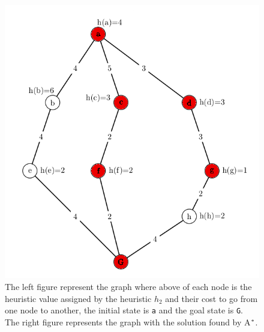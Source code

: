 \begin{figure}[!htb]
  \includegraphics[width=\linewidth]{images/marvinh2fulladgcfG-right}
\endminipage
\caption{The left figure represent the graph where above of each node is the heuristic value assigned by the heuristic $h_{2}$ and their cost to go from one node to another, the initial state is \texttt{a} and the goal state is \texttt{G}. The right figure represents the graph with the solution found by A$\sp{*}$. }\label{fig:image_h2_astar}
\end{figure}

